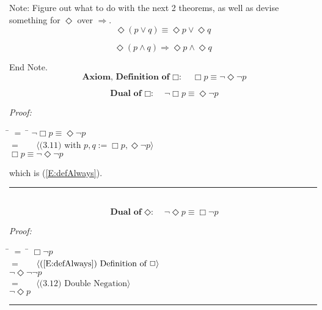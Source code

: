 \documentclass[fleqn, leqno]{article}
\newcommand{\lgap}{2pt}                             %
\newcommand{\mymathindent}{24pt}                      %
\newcommand{\myqed}{\hfill\rule[-.23ex]{1.2ex}{2.0ex}}
\newcommand{\Gll} {\langle}                         %
\newcommand{\Ggg} {\rangle}                         %
\newcommand{\Hint}[1]     {\ \ \ $\Gll              \mbox{#1} \Ggg$ }   %
\begin{document}
Note: Figure out what to do with the next 2 theorems, as well as devise something for $\Diamond$ over $\Rightarrow$.\\

\begin{equation}\label{E:distEventOr}
\Diamond(p \lor q) \equiv \Diamond p \lor \Diamond q
\end{equation}

\begin{equation}\label{E:distEventAnd}
\Diamond(p \land q) \Rightarrow \Diamond p \land \Diamond q
\end{equation}

End Note.\\

\begin{equation}\label{E:defAlways}
\textbf{Axiom, Definition of $\Box$:}\quad \Box p \equiv \lnot\Diamond\lnot p
\end{equation}

\begin{equation}\label{E:dualAlways}
\textbf{Dual of $\Box$:}\quad \lnot\Box p \equiv \Diamond\lnot p
\end{equation}

\emph{Proof:}
\begin{tabbing}
\hspace{\mymathindent} \= $= \;$ \= \kill
  \> \>   $\lnot\Box p \equiv \Diamond\lnot p$\\[\lgap]
  \> $=$  \>  \Hint{(3.11) with $p,q := \Box p, \Diamond\lnot p$}\\[\lgap]
  \> \>   $\Box p \equiv \lnot\Diamond\lnot p$
\end{tabbing}
which is (\ref{E:defAlways}). \myqed\\[\lgap]


\begin{equation}\label{E:dualEvent}
\textbf{Dual of $\Diamond$:}\quad \lnot\Diamond p \equiv \Box\lnot p
\end{equation}

\emph{Proof:}
\begin{tabbing}
\hspace{\mymathindent} \= $= \;$ \= \kill
  \> \>   $\Box\lnot p$\\[\lgap]
  \> $=$  \>  \Hint{(\ref{E:defAlways}) Definition of $\Box$}\\[\lgap]
  \> \>   $\lnot\Diamond\lnot\lnot p$\\[\lgap]
  \> $=$  \>  \Hint{(3.12) Double Negation}\\[\lgap]
  \> \>   $\lnot\Diamond p$\\[\lgap]
\end{tabbing}
\myqed\\[\lgap]
\end{document}
